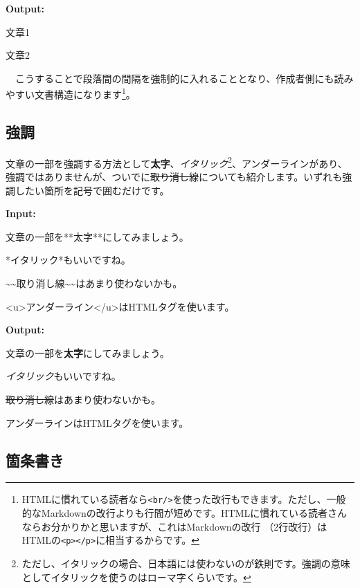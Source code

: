 \documentclass[
  a4paper,
  pandoc,
  ja=standard,
  jafont=haranoaji]{bxjsbook}
\newenvironment{Shaded}{\begin{snugshade}}{\end{snugshade}}
\newcommand{\KeywordTok}[1]{\textcolor[rgb]{0.00,0.48,0.65}{#1}}
\newcommand{\NormalTok}[1]{\textcolor[rgb]{0.00,0.48,0.65}{#1}}
\begin{document}
\textbf{Output:}

文章1

文章2

　こうすることで段落間の間隔を強制的に入れることとなり、作成者側にも読みやすい文書構造になります\footnote{HTMLに慣れている読者なら\texttt{\textless{}br/\textgreater{}}を使った改行もできます。ただし、一般的なMarkdownの改行よりも行間が短めです。HTMLに慣れている読者さんならお分かりかと思いますが、これはMarkdownの改行
  （2行改行）はHTMLの\texttt{\textless{}p\textgreater{}\textless{}/p\textgreater{}}に相当するからです。}。

\hypertarget{ux5f37ux8abf}{%
\subsection{強調}\label{ux5f37ux8abf}}

文章の一部を強調する方法として\textbf{太字}、\emph{イタリック}\footnote{ただし、イタリックの場合、日本語には使わないのが鉄則です。強調の意味としてイタリックを使うのはローマ字くらいです。}、アンダーラインがあり、強調ではありませんが、ついでに\sout{取り消し線}についても紹介します。いずれも強調したい箇所を記号で囲むだけです。

\textbf{Input:}

\begin{Shaded}
\begin{Highlighting}[]
\NormalTok{文章の一部を**太字**にしてみましょう。}

\NormalTok{*イタリック*もいいですね。}

\NormalTok{\textasciitilde{}\textasciitilde{}取り消し線\textasciitilde{}\textasciitilde{}はあまり使わないかも。}

\KeywordTok{\textless{}u\textgreater{}}\NormalTok{アンダーライン}\KeywordTok{\textless{}/u\textgreater{}}\NormalTok{はHTMLタグを使います。}
\end{Highlighting}
\end{Shaded}

\textbf{Output:}

文章の一部を\textbf{太字}にしてみましょう。

\emph{イタリック}もいいですね。

\sout{取り消し線}はあまり使わないかも。

アンダーラインはHTMLタグを使います。

\hypertarget{ux7b87ux6761ux66f8ux304d}{%
\subsection{箇条書き}\label{ux7b87ux6761ux66f8ux304d}}
\end{document}
